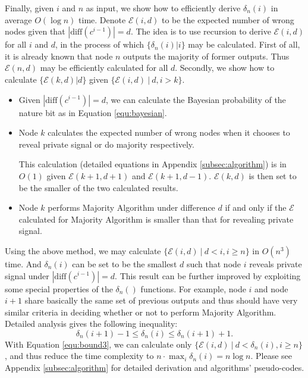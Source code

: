 \documentclass[a4paper,UKenglish]{lipics}
\theoremstyle{definition}
\newcommand{\diff}{\text{diff}}
\begin{document}
Finally, given $i$ and $n$ as input, we show how to efficiently derive $\delta_n(i)$ in average $O(\log n)$ time. 
Denote $\mathcal{E}(i,d)$ to be the expected number of wrong nodes given that $|\diff(c^{i-1})| = d$. 
The idea is to use recursion to derive $\mathcal{E}(i,d)$ for all $i$ and $d$, in the process of which $\{\delta_n(i)|i\}$ may be calculated.
First of all, it is already known that node $n$ outputs the majority of former outputs.
Thus $\mathcal{E}(n,d)$ may be efficiently calculated for all $d$.
Secondly, we show how to calculate $\{\mathcal{E}(k,d)|d\}$ given $\{\mathcal{E}(i,d)~|~d, i > k\}$.
\begin{itemize}
\item Given $|\diff(c^{i-1})| = d$, we can calculate the Bayesian probability of the nature bit as in Equation \eqref{equ:bayesian}.
\item Node $k$ calculates the expected number of wrong nodes when it chooses to reveal private signal or do majority respectively.
	 
	This calculation (detailed equations in Appendix \ref{subsec:algorithm}) is in $O(1)$ given $\mathcal{E}(k+1,d+1)$ and $\mathcal{E}(k+1,d-1)$.
	$\mathcal{E}(k,d)$ is then set to be the smaller of the two calculated results. 
\item Node $k$ performs Majority Algorithm under difference $d$ if and only if the $\mathcal{E}$ calculated for Majority Algorithm is smaller than that for revealing private signal.
\end{itemize}
Using the above method, we may calculate $\{\mathcal{E}(i,d)~|~d < i, i \ge n\}$ in $O(n^3)$ time.
And $\delta_n(i)$ can be set to be the smallest $d$ such that node $i$ reveals private signal under $|\diff(c^{i-1})| = d$.
This result can be further improved by exploiting some special properties of the $\delta_n()$ functions.
For example, node $i$ and node $i+1$ share basically the same set of previous outputs 
	and thus should have very similar criteria in deciding whether or not to perform Majority Algorithm.
Detailed analysis gives the following inequality:
\begin{equation}
\label{equ:bound3}
\delta_n(i+1)-1\le \delta_n(i)\le \delta_n(i+1)+1.
\end{equation}
With Equation \eqref{equ:bound3}, we can calculate only $\{\mathcal{E}(i,d)~|~d < \delta_n(i), i \ge n\}$,
	and thus reduce the time complexity to $n\cdot \max_{i}\delta_n(i) = n\log n$.
Please see Appendix \ref{subsec:algorithm} for detailed derivation and algorithms' pseudo-codes.
\end{document}
